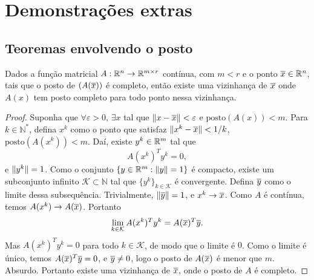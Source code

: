 \chapter{Demonstrações extras}

\section{Teoremas envolvendo o posto}

\begin{theorem}
Dados a função matricial $A:\mathbb{R}^{n}\rightarrow\mathbb{R}^{{m}\times{r}}$ contínua, com $m < r$ e o ponto 
$\overline{x} \in \mathbb{R}^{n}$, 
tais que o posto de $(A(\overline{x}))$ é completo, então existe uma vizinhança de $\overline{x}$
onde $A(x)$ tem posto completo para todo ponto nessa vizinhança.
\end{theorem}
\begin{proof}
Suponha que $\forall \varepsilon > 0$, $\exists x$ tal que $\Vert x - \overline{x}\Vert < \varepsilon$
e $\mbox{posto}(A(x)) < m$. Para $k \in \mathbb{N^*}$, defina $x^k$ como o ponto que satisfaz
$\Vert x^k - \overline{x}\Vert < 1/k$, $\mbox{posto}(A(x^k)) < m$. Daí, existe $y^k \in \mathbb{R}^{m}$
tal que $$A(x^k)^Ty^k = 0,$$ e $\Vert y^k\Vert = 1$. 
Como o conjunto $\{y \in \mathbb{R}^{m} : \Vert y\Vert = 1\}$ é compacto,
existe um subconjunto infinito
$\mathcal{K} \subset \mathbb{N}$ tal que $\{y^k\}_{k \in \mathcal{K}}$ é convergente.
Defina $\overline{y}$ como o limite dessa subsequência. Trivialmente, $\Vert \overline{y}\Vert = 1$,
e $x^k \rightarrow \overline{x}$. Como $A$ é contínua, temos $A(x^k) \rightarrow A(\overline{x})$.
Portanto
$$\lim_{k \in \mathcal{K}} A(x^k)^Ty^k = A(\overline{x})^T\overline{y}.$$
Mas $A(x^k)^Ty^k = 0$ para todo $k \in \mathcal{K}$, de modo que o limite é $0$. Como o
limite é único, temos
$A(\overline{x})^T\overline{y} = 0$, e $\overline{y} \neq 0$, logo o posto de
$A(\overline{x})$ é menor que $m$. Absurdo. Portanto existe uma vizinhança de $\overline{x}$,
onde o posto de $A$ é completo.
\end{proof}

